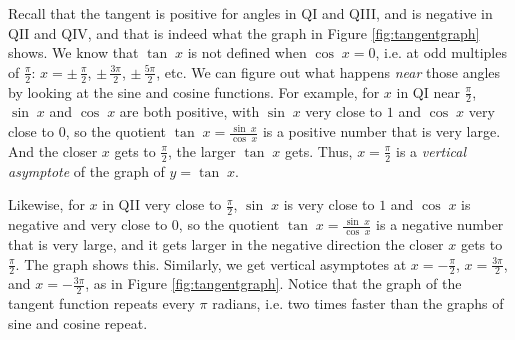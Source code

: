 Recall that the tangent is positive for angles in QI and QIII, and is negative in QII and QIV, and
that is indeed what the graph in Figure \ref{fig:tangentgraph} shows. We know that $\tan\;x$ is
not defined when $\cos\;x = 0$, i.e. at odd multiples of $\frac{\pi}{2}$: $x=\pm\,\frac{\pi}{2}$,
$\pm\,\frac{3\pi}{2}$, $\pm\,\frac{5\pi}{2}$, etc. We can figure out what happens \emph{near} those
angles by looking at the sine and cosine functions. For example, for $x$ in QI near $\frac{\pi}{2}$,
$\sin\;x$ and $\cos\;x$ are both positive, with $\sin\;x$ very close to $1$ and $\cos\;x$ very close
to $0$, so the quotient $\tan\;x = \frac{\sin\;x}{\cos\;x}$ is a positive number that is very large.
And the closer $x$ gets to $\frac{\pi}{2}$, the larger $\tan\;x$ gets. Thus, $x=\frac{\pi}{2}$ is a
\emph{vertical asymptote} of the graph of
$y=\tan\;x$.

Likewise, for $x$ in QII very close to $\frac{\pi}{2}$, $\sin\;x$ is very close to $1$ and $\cos\;x$
is negative and very close to $0$, so the quotient $\tan\;x = \frac{\sin\;x}{\cos\;x}$ is a negative
number that is very large, and it gets larger in the negative direction the closer $x$ gets to
$\frac{\pi}{2}$. The graph shows this. Similarly, we get vertical asymptotes at $x=-\frac{\pi}{2}$,
$x=\frac{3\pi}{2}$, and $x=-\frac{3\pi}{2}$, as in Figure \ref{fig:tangentgraph}. Notice that
the graph of the tangent function repeats every $\pi$ radians, i.e. two times faster than the
graphs of sine and cosine repeat.

